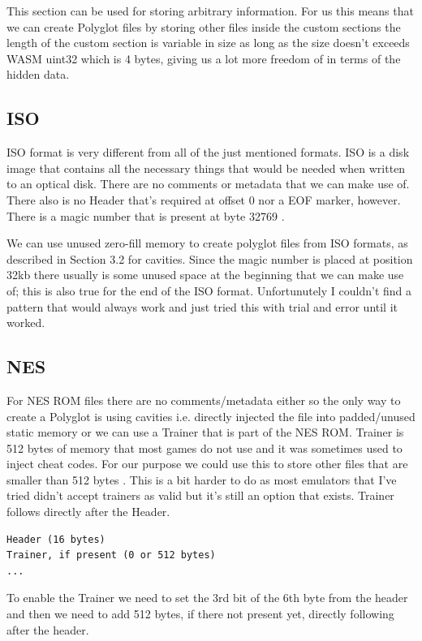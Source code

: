 This section can be used for storing arbitrary information. For us this means that we can create Polyglot files by storing other files inside the custom sections
the length of the custom section is variable in size as long as the size doesn't exceeds WASM uint32 which is 4 bytes, giving us a lot more freedom of in terms
of the hidden data.

\subsection{ISO}

ISO format is very different from all of the just mentioned formats. ISO is a disk image that contains all the necessary things that would be needed when written to an optical disk. There are no comments or metadata that we can make use of. There also is no Header that's required at offset 0 nor a EOF marker, however.
There is a magic number that is present at byte 32769 \cite{iso}.

We can use unused zero-fill memory to create polyglot files from ISO formats, as described in Section 3.2 for cavities.
Since the magic number is placed at position 32kb there usually is some unused space
at the beginning that we can make use of; this is also true for the end of the ISO format. 
Unfortunutely I couldn't find a pattern that would always work and just tried this with trial and error until it worked.

\subsection{NES}

For NES ROM files there are no comments/metadata either so the only way to create a Polyglot is using cavities i.e. directly injected the file into padded/unused static memory
or we can use a Trainer that is part of the NES ROM. Trainer is 512 bytes of memory that most games do not use and it was sometimes used to inject cheat codes. For our purpose
we could use this to store other files that are smaller than 512 bytes \cite{nes}. This is a bit harder to do as most emulators that I've tried didn't accept trainers as valid
but it's still an option that exists. Trainer follows directly after the Header.

\begin{verbatim}
Header (16 bytes)
Trainer, if present (0 or 512 bytes)
...
\end{verbatim}

To enable the Trainer we need to set the 3rd bit of the 6th byte from the header and then we need to add 512 bytes, if there not present yet, directly following after
the header.
